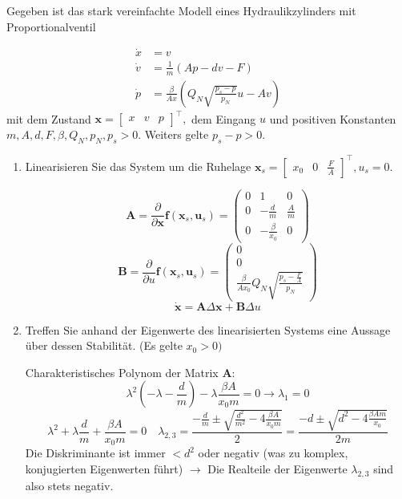 \documentclass[crop=false]{standalone}
\begin{document}
\begin{task}
Gegeben ist das stark vereinfachte Modell eines Hydraulikzylinders mit Proportionalventil

\[ 
\begin{aligned} \dot{x} &=v \\ \dot{v} &=\frac{1}{m}(A p-d v-F) \\ \dot{p} &=\frac{\beta}{A x}\left(Q_{N} \sqrt{\frac{p_{s}-p}{p_{N}}} u-A v\right) \end{aligned}
 \]
mit dem Zustand $\mathbf{x}=\left[\begin{array}{ccc}{x} & {v} & {p}\end{array}\right]^{\top},$ dem Eingang $u$ und positiven Konstanten
$m, A, d, F, \beta, Q_{N}, p_{N}, p_{s}>0 .$ Weiters gelte $p_{s}-p>0$.
\begin{enumerate}[i]
    \item Linearisieren Sie das System um die Ruhelage $\mathbf{x}_{s}=\left[\begin{array}{ccc}{x_{0}} & {0} & {\frac{F}{A}}\end{array}\right]^{\top}, u_{s}=0$.
    \begin{solution}
    \[ 
\mathbf{A}=\frac{\partial}{\partial \mathbf{x}} \mathbf{f}\left(\mathbf{x}_{s}, \mathbf{u}_{s}\right) = 
\begin{pmatrix}
 0 & 1 & 0\\
 0 & -\frac{d}{m} & \frac{A}{m}\\
 0 & -\frac{\beta}{x_0} & 0
\end{pmatrix}
 \]
    \[
    \mathbf{B}=\frac{\partial}{\partial u} \mathbf{f}\left(\mathbf{x}_{s}, \mathbf{u}_{s}\right) = 
    \begin{pmatrix}
 0\\
 0\\
 \frac{\beta}{A x_0} Q_N \sqrt{\frac{p_s - \frac{F}{A}}{p_N}}
\end{pmatrix}
 \]
 \[\dot{\mathbf{x}}= \mathbf{A} \Delta \mathbf{x} + \mathbf{B} \Delta u \]
    \end{solution}
    \item Treffen Sie anhand der Eigenwerte des linearisierten Systems eine Aussage über
dessen Stabilität. (Es gelte $x_{0}>0 )$
\begin{solution}
    Charakteristisches Polynom der Matrix $\mathbf{A}$:
    \[\lambda^2 \left(-\lambda-\frac{d}{m}\right) - \lambda \frac{\beta A}{x_0 m} = 0 \rightarrow \lambda_1 = 0\]
    \[
    \lambda^2+\lambda \frac{d}{m}+\frac{\beta A}{x_0 m} = 0 \quad \lambda_{2,3} = \frac{-\frac{d}{m} \pm \sqrt{\frac{d^2}{m^2}-4\frac{\beta A}{x_0 m}}}{2} =
    \frac{-d \pm \sqrt{d^2-4\frac{\beta A m}{x_0}}}{2m}
    \]
    Die Diskriminante ist immer $< d^2$ oder negativ (was zu komplex, konjugierten Eigenwerten führt) $\rightarrow$ Die Realteile der Eigenwerte $\lambda_{2,3}$ sind also stets negativ.
    

\end{solution}
\end{enumerate}
\end{task}
\end{document}
